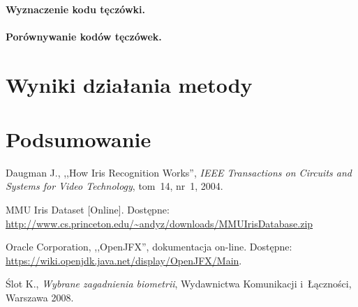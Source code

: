 \documentclass[11pt,a4paper]{article}
\begin{document}
\paragraph{Wyznaczenie kodu tęczówki.}

\paragraph{Porównywanie kodów tęczówek.}

\section{Wyniki działania metody}

\section{Podsumowanie}

\begin{thebibliography}{9}

        Daugman J.,
        ,,How Iris Recognition Works'',
        \emph{IEEE Transactions on Circuits and Systems for Video Technology},
        tom~14,
        nr~1,
        2004.
        
        MMU Iris Dataset
        [Online].
        Dostępne: \url{http://www.cs.princeton.edu/~andyz/downloads/MMUIrisDatabase.zip}

        Oracle Corporation,
        ,,OpenJFX'',
        dokumentacja on-line.
        Dostępne: \url{https://wiki.openjdk.java.net/display/OpenJFX/Main}.

        Ślot K.,
        \emph{Wybrane zagadnienia biometrii},
        Wydawnictwa Komunikacji i~Łączności,
        Warszawa 2008.

\end{thebibliography}
\end{document}
